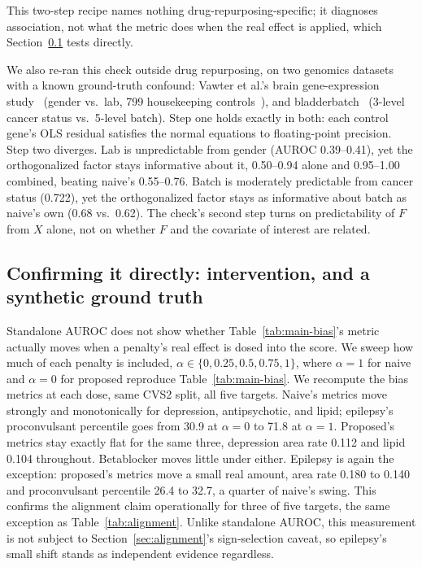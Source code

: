 \documentclass{llncs}
\begin{document}
This two-step recipe names nothing drug-repurposing-specific; it diagnoses association, not what the metric does when the real effect is applied, which Section~\ref{sec:intervention} tests directly.

\label{sec:ruv-generalization}
We also re-ran this check outside drug repurposing, on two genomics datasets with a known ground-truth confound: Vawter et al.'s brain gene-expression study~\cite{vawter2004gender} (gender vs.\ lab, 799 housekeeping controls~\cite{eisenberg2003housekeeping}), and bladderbatch~\cite{dyrskjot2004bladder,leek2010batcheffects} (3-level cancer status vs.\ 5-level batch). Step one holds exactly in both: each control gene's OLS residual satisfies the normal equations to floating-point precision. Step two diverges. Lab is unpredictable from gender (AUROC 0.39--0.41), yet the orthogonalized factor stays informative about it, 0.50--0.94 alone and 0.95--1.00 combined, beating naive's 0.55--0.76. Batch is moderately predictable from cancer status (0.722), yet the orthogonalized factor stays as informative about batch as naive's own (0.68 vs.\ 0.62). The check's second step turns on predictability of $F$ from $X$ alone, not on whether $F$ and the covariate of interest are related.

\subsection{Confirming it directly: intervention, and a synthetic ground truth}
\label{sec:intervention}
Standalone AUROC does not show whether Table~\ref{tab:main-bias}'s metric actually moves when a penalty's real effect is dosed into the score. We sweep how much of each penalty is included, $\alpha\in\{0,0.25,0.5,0.75,1\}$, where $\alpha=1$ for naive and $\alpha=0$ for proposed reproduce Table~\ref{tab:main-bias}. We recompute the bias metrics at each dose, same CVS2 split, all five targets. Naive's metrics move strongly and monotonically for depression, antipsychotic, and lipid; epilepsy's proconvulsant percentile goes from 30.9 at $\alpha=0$ to 71.8 at $\alpha=1$. Proposed's metrics stay exactly flat for the same three, depression area rate 0.112 and lipid 0.104 throughout. Betablocker moves little under either. Epilepsy is again the exception: proposed's metrics move a small real amount, area rate 0.180 to 0.140 and proconvulsant percentile 26.4 to 32.7, a quarter of naive's swing. This confirms the alignment claim operationally for three of five targets, the same exception as Table~\ref{tab:alignment}. Unlike standalone AUROC, this measurement is not subject to Section~\ref{sec:alignment}'s sign-selection caveat, so epilepsy's small shift stands as independent evidence regardless.
\end{document}
